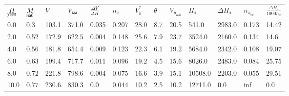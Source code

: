 \begin{tabular}{lllllllllllll}
$\underset{узел}{H}$ & $\underset{наб}{M}$ & $V$ & $V_{км}$ & $\frac{\Delta V}{\Delta H}$ & $n_x$ & $V_{y}^*$ & $\theta$ & $V_{y_{наб}}$ & $H_э$ & $\Delta H_э$ & $n_{x_{ср}}$ & $\frac{\Delta H_{э}}{1000 n_x}$ \\
0.0 & 0.3 & 103.1 & 371.0 & 0.035 & 0.207 & 28.0 & 8.7 & 20.5 & 541.0 & 2983.0 & 0.173 & 14.42 \\
2.0 & 0.52 & 172.9 & 622.5 & 0.004 & 0.148 & 25.6 & 7.9 & 23.7 & 3524.0 & 2160.0 & 0.134 & 14.6 \\
4.0 & 0.56 & 181.8 & 654.4 & 0.009 & 0.123 & 22.3 & 6.1 & 19.2 & 5684.0 & 2342.0 & 0.108 & 19.07 \\
6.0 & 0.63 & 199.4 & 717.7 & 0.011 & 0.096 & 19.2 & 4.5 & 15.6 & 8026.0 & 2483.0 & 0.084 & 25.75 \\
8.0 & 0.72 & 221.8 & 798.6 & 0.004 & 0.075 & 16.6 & 3.9 & 15.1 & 10508.0 & 2203.0 & 0.055 & 29.51 \\
10.0 & 0.77 & 230.6 & 830.3 & 0.0 & 0.044 & 10.2 & 2.5 & 10.2 & 12711.0 & 0.0 & inf & 0.0 \\
\end{tabular}
